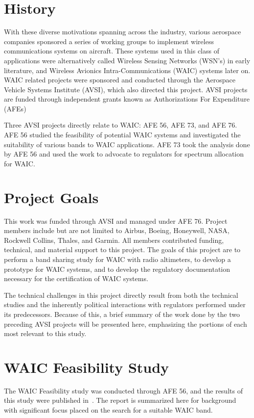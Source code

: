 \section{History} 

With these diverse motivations spanning across the industry, various aerospace companies sponsored a series of working groups to implement wireless communications systems on aircraft. These systems used in this class of applications were alternatively called Wireless Sensing Networks (WSN's) in early literature, and Wireless Avionics Intra-Communications (WAIC) systems later on. WAIC related projects were sponsored and conducted through the Aerospace Vehicle Systems Institute (AVSI), which also directed this project. AVSI projects are funded through independent grants known as Authorizations For Expenditure (AFEs)

Three AVSI projects directly relate to WAIC: AFE 56, AFE 73, and AFE 76. AFE 56 studied the feasibility of potential WAIC systems  and investigated the suitability of various bands to WAIC applications. AFE 73 took the analysis done by AFE 56 and used the work to advocate to regulators for spectrum allocation for WAIC. 

\section{Project Goals}
This work was funded through AVSI and managed under AFE 76. Project members include but are not limited to Airbus, Boeing, Honeywell, NASA, Rockwell Collins, Thales, and Garmin. All members contributed funding, technical, and material support to this project. The goals of this project are to perform a band sharing study for WAIC with radio altimeters, to develop a prototype for WAIC systems, and to develop the regulatory documentation necessary for the certification of WAIC systems. 

The technical challenges in this project directly result from both the technical studies and the inherently political interactions with regulators performed under its predecessors. Because of this, a brief summary of the work done by the two preceding AVSI projects will be presented here, emphasizing the portions of each most relevant to this study. 

\section{WAIC Feasibility Study}
The WAIC Feasibility study was conducted through AFE 56, and the results of this study were published in~\cite{ferrell_feasibility_2007}. The report is summarized here for background with significant focus placed on the search for a suitable WAIC band. 

